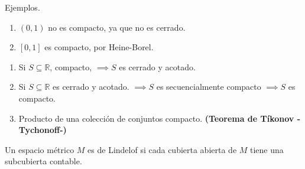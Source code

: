 \begin{ejemplo} Ejemplos.
	\begin{enumerate}
		\item $(0,1)$ no es compacto, ya que no es cerrado. 
		\item $[0,1]$ es compacto, por Heine-Borel.
	\end{enumerate}
\end{ejemplo}

\begin{cajita}
	\begin{enumerate}
		\item Si $S\subseteq \mathbb{R}$, compacto, $\implies S$ es cerrado y acotado. 
		\item Si $S\subseteq \mathbb{R}$ es cerrado y acotado. $\implies S$ es secuencialmente compacto $\implies S$ es compacto. \item Producto de una colección de conjuntos compacto. \textbf{(Teorema de Tíkonov -Tychonoff-)}
	\end{enumerate}
\end{cajita}

\begin{nota}
	Un espacio métrico $M$ es de Lindelof si cada cubierta abierta de $M$ tiene una subcubierta contable. 
\end{nota}

